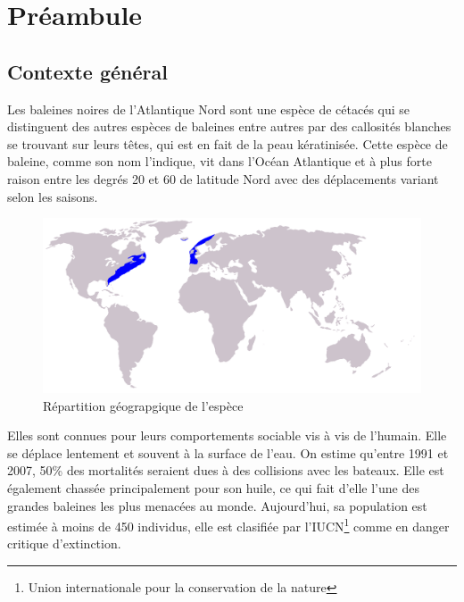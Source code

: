 \documentclass[12pt,a4paper]{report}
\begin{document}
\setlength{\cftbeforetoctitleskip}{-50pt} %
\begin{spacing}{1.2}
   \tableofcontents
\end{spacing}

\newpage

\section{Préambule}
\begin{spacing}{1.5}
\subsection{Contexte général}
Les baleines noires de l’Atlantique Nord sont une espèce de cétacés qui se distinguent des autres espèces de baleines entre autres par des callosités blanches se trouvant sur leurs têtes, qui est en fait de la peau kératinisée. Cette espèce de baleine, comme son nom l'indique, vit dans l'Océan Atlantique et à plus forte raison entre les degrés 20 et 60 de latitude Nord avec des déplacements variant selon les saisons.

\begin{figure}[H]
\begin{center}
\includegraphics[scale=0.30]{figures/repartition.png}
\caption{Répartition géograpgique de l'espèce}
\end{center}
\end{figure}

Elles sont connues pour leurs comportements sociable vis à vis de l’humain. Elle se déplace lentement et souvent à la surface de l’eau. On estime qu’entre 1991 et 2007, 50\% des mortalités seraient dues à des collisions avec les bateaux\cite{WinNT}. Elle est également chassée principalement pour son huile, ce qui fait d'elle l'une des grandes baleines les plus menacées au monde. Aujourd’hui, sa population est estimée à moins de 450 individus, elle est clasifiée par l’IUCN\footnote{Union internationale pour la conservation de la nature} comme en danger critique d’extinction.


\end{spacing}
\end{document}
